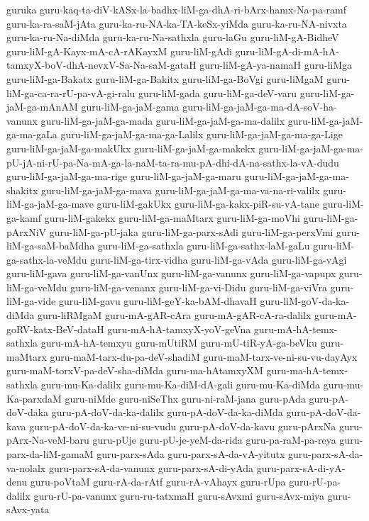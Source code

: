 {guruka
guru-kaq-ta-diV-kASx-la-badhx-liM-ga-dhA-ri-bArx-hamx-Na-pa-ramf
guru-ka-ra-saM-jAta
guru-ka-ru-NA-ka-TA-keSx-yiMda
guru-ka-ru-NA-nivxta
guru-ka-ru-Na-diMda
guru-ka-ru-Na-sathxla
guru-laGu
guru-liM-gA-BidheV
guru-liM-gA-Kayx-mA-cA-rAKayxM
guru-liM-gAdi
guru-liM-gA-di-mA-hA-tamxyX-boV-dhA-nevxV-Sa-Na-saM-gataH
guru-liM-gA-ya-namaH
guru-liMga
guru-liM-ga-Bakatx
guru-liM-ga-Bakitx
guru-liM-ga-BoVgi
guru-liMgaM
guru-liM-ga-ca-ra-rU-pa-vA-gi-ralu
guru-liM-gada
guru-liM-ga-deV-varu
guru-liM-ga-jaM-ga-mAnAM
guru-liM-ga-jaM-gama
guru-liM-ga-jaM-ga-ma-dA-soV-ha-vanunx
guru-liM-ga-jaM-ga-mada
guru-liM-ga-jaM-ga-ma-dalilx
guru-liM-ga-jaM-ga-ma-gaLa
guru-liM-ga-jaM-ga-ma-ga-Lalilx
guru-liM-ga-jaM-ga-ma-ga-Lige
guru-liM-ga-jaM-ga-makUkx
guru-liM-ga-jaM-ga-makekx
guru-liM-ga-jaM-ga-ma-pU-jA-ni-rU-pa-Na-mA-ga-la-naM-ta-ra-mu-pA-dhi-dA-na-sathx-la-vA-dudu
guru-liM-ga-jaM-ga-ma-rige
guru-liM-ga-jaM-ga-maru
guru-liM-ga-jaM-ga-ma-shakitx
guru-liM-ga-jaM-ga-mava
guru-liM-ga-jaM-ga-ma-va-na-ri-valilx
guru-liM-ga-jaM-ga-mave
guru-liM-gakUkx
guru-liM-ga-kakx-piR-su-vA-tane
guru-liM-ga-kamf
guru-liM-gakekx
guru-liM-ga-maMtarx
guru-liM-ga-moVhi
guru-liM-ga-pArxNiV
guru-liM-ga-pU-jaka
guru-liM-ga-parx-sAdi
guru-liM-ga-perxVmi
guru-liM-ga-saM-baMdha
guru-liM-ga-sathxla
guru-liM-ga-sathx-laM-gaLu
guru-liM-ga-sathx-la-veMdu
guru-liM-ga-tirx-vidha
guru-liM-ga-vAda
guru-liM-ga-vAgi
guru-liM-gava
guru-liM-ga-vanUnx
guru-liM-ga-vanunx
guru-liM-ga-vapupx
guru-liM-ga-veMdu
guru-liM-ga-venanx
guru-liM-ga-vi-Didu
guru-liM-ga-viVra
guru-liM-ga-vide
guru-liM-gavu
guru-liM-geY-ka-bAM-dhavaH
guru-liM-goV-da-ka-diMda
guru-liRMgaM
guru-mA-gAR-cAra
guru-mA-gAR-cA-ra-dalilx
guru-mA-goRV-katx-BeV-dataH
guru-mA-hA-tamxyX-yoV-geVna
guru-mA-hA-temx-sathxla
guru-mA-hA-temxyu
guru-mUtiRM
guru-mU-tiR-yA-ga-beVku
guru-maMtarx
guru-maM-tarx-du-pa-deV-shadiM
guru-maM-tarx-ve-ni-su-vu-dayAyx
guru-maM-torxV-pa-deV-sha-diMda
guru-ma-hAtamxyXM
guru-ma-hA-temx-sathxla
guru-mu-Ka-dalilx
guru-mu-Ka-diM-dA-gali
guru-mu-Ka-diMda
guru-mu-Ka-parxdaM
guru-niMde
guru-niSeThx
guru-ni-raM-jana
guru-pAda
guru-pA-doV-daka
guru-pA-doV-da-ka-dalilx
guru-pA-doV-da-ka-diMda
guru-pA-doV-da-kava
guru-pA-doV-da-ka-ve-ni-su-vudu
guru-pA-doV-da-kavu
guru-pArxNa
guru-pArx-Na-veM-baru
guru-pUje
guru-pU-je-yeM-da-rida
guru-pa-raM-pa-reya
guru-parx-da-liM-gamaM
guru-parx-sAda
guru-parx-sA-da-vA-yitutx
guru-parx-sA-da-va-nolalx
guru-parx-sA-da-vanunx
guru-parx-sA-di-yAda
guru-parx-sA-di-yA-denu
guru-poVtaM
guru-rA-da-rAtf
guru-rA-vAhayx
guru-rUpa
guru-rU-pa-dalilx
guru-rU-pa-vanunx
guru-ru-tatxmaH
guru-sAvxmi
guru-sAvx-miya
guru-sAvx-yata
}
